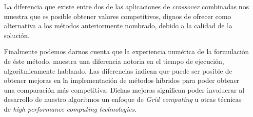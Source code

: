 La diferencia que existe entre dos de las aplicaciones de \emph{crossover} combinadas nos muestra que es posible
obtener valores competitivos, dignos de ofrecer como alternativa a los métodos anteriormente nombrado, debido
a la calidad de la solución.

Finalmente podemos darnos cuenta que la experiencia numérica de la formulación de éste método, muestra una diferencia
notoria en el tiempo de ejecución, algoritmicamente hablando.
Las diferencias indican que puede ser posible de obtener mejoras en la implementación de métodos híbridos para 
poder obtener una comparación más competitiva. Dichas mejoras significan poder involucrar al desarrollo de nuestro
algoritmos un enfoque de \emph{Grid computing} u otras técnicas de \emph{high performance computing technologies}.
